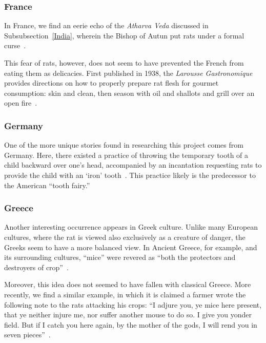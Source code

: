 \documentclass[12pt]{article}
\begin{document}
\subsubsection{France} \label{France}

In France, we find an eerie echo of the \textit{Atharva Veda} discussed in Subsubsection~\ref{India}, wherein the Bishop of Autun put rats under a formal curse~\cite{Barnett2001}.

This fear of rats, however, does not seem to have prevented the French from eating them as delicacies. First published in 1938, the \textit{Larousse Gastronomique} provides directions on how to properly prepare rat flesh for gourmet consumption: skin and clean, then season with oil and shallots and grill over an open fire~\cite{Barnett2001}.

\subsubsection{Germany} \label{Germany}

One of the more unique stories found in researching this project comes from Germany. Here, there existed a practice of throwing the temporary tooth of a child backward over one's head, accompanied by an incantation requesting rats to provide the child with an `iron' tooth~\cite{Barnett2001}. This practice likely is the predecessor to the American ``tooth fairy.''

\subsubsection{Greece} \label{Greece}

Another interesting occurrence appears in Greek culture. Unlike many European cultures, where the rat is viewed also exclusively as a creature of danger, the Greeks seem to have a more balanced view. In Ancient Greece, for example, and its surrounding cultures, ``mice'' were revered as ``both the protectors and destroyers of crop''~\cite{ONeill}.

Moreover, this idea does not seemed to have fallen with classical Greece. More recently, we find a similar example, in which it is claimed a farmer wrote the following note to the rats attacking his crops: ``I adjure you, ye mice here present, that ye neither injure me, nor suffer another mouse to do so. I give you yonder field. But if I catch you here again, by the mother of the gods, I will rend you in seven pieces''~\cite{Barnett2001}.
\end{document}
